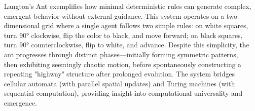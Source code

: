 Langton's Ant exemplifies how minimal deterministic rules can generate complex, emergent behavior without external guidance. This system operates on a two-dimensional grid where a single agent follows two simple rules: on white squares, turn 90° clockwise, flip the color to black, and move forward; on black squares, turn 90° counterclockwise, flip to white, and advance. Despite this simplicity, the ant progresses through distinct phases—initially forming symmetric patterns, then exhibiting seemingly chaotic motion, before spontaneously constructing a repeating "highway" structure after prolonged evolution. The system bridges cellular automata (with parallel spatial updates) and Turing machines (with sequential computation), providing insight into computational universality and emergence.